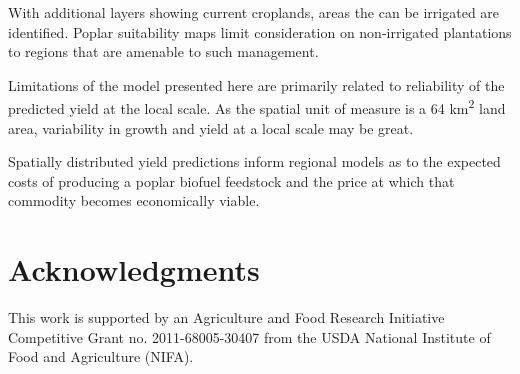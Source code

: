 \documentclass[preprint,review,12pt]{elsarticle}
\begin{document}
With additional layers showing current croplands, areas the can be
irrigated are identified.  Poplar suitability maps limit consideration
on non-irrigated plantations to regions that are amenable to such
management.

Limitations of the model presented here are primarily related to
reliability of the predicted yield at the local scale. As the spatial
unit of measure is a 64 km\textsuperscript{2} land area, variability
in growth and yield at a local scale may be great.

Spatially distributed yield predictions inform regional models as to
the expected costs of producing a poplar biofuel feedstock and the
price at which that commodity becomes economically viable.

\section{Acknowledgments}
This work is supported by an Agriculture and Food Research Initiative
Competitive Grant no. 2011-68005-30407 from the USDA National
Institute of Food and Agriculture (NIFA).



 


\end{document}
